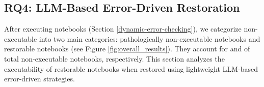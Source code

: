
\subsection{RQ4: LLM-Based Error-Driven Restoration}
\label{sec:results}
    
    After executing notebooks (Section \ref{dynamic-error-checking}), we categorize \totalNonExecutable non-executable into two main categories: \totalPathological pathologically non-executable notebooks and \totalRestorable restorable notebooks (see Figure \ref{fig:overall_results}). They account for \percentPathological and \percentRestorableInNonExecutable of total non-executable notebooks, respectively.
    This section analyzes the executability of restorable notebooks when restored using lightweight LLM-based error-driven strategies.

